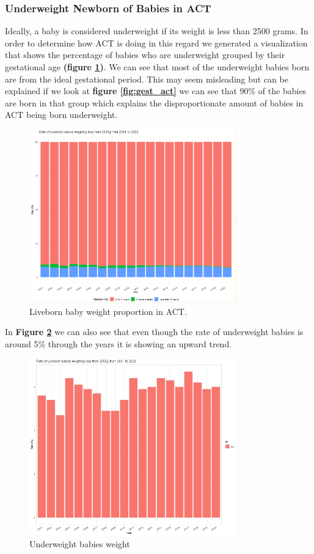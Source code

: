 \subsubsection{Underweight Newborn of Babies in ACT}
Ideally, a baby is considered underweight if its weight is less than 2500 grams. In order to determine how ACT is doing in this regard we generated a visualization that shows the percentage of babies who are underweight grouped by their gestational age \textbf{(figure \ref{fig:weight_gest})}. We can see that most of the underweight babies born are from the ideal gestational period. This may seem misleading but can be explained if we look at \textbf{figure \ref{fig:gest_act}} we can see that 90\% of the babies are born in that group which explains the disproportionate amount of babies in ACT being born underweight.

\begin{figure}
  \centering
  \includegraphics[width=0.8\textwidth]{subsections/baby_health/live_born_weigh_proportion_act.png}
  \caption{Liveborn baby weight proportion in ACT.}
  \label{fig:weight_gest}
\end{figure}

In \textbf{Figure \ref{fig:weight_act}} we can also see that even though the rate of underweight babies is around 5\% through the years it is showing an upward trend.

\begin{figure}
  \centering
  \includegraphics[width=0.8\textwidth]{subsections/baby_health/liveborn_weight.jpg}
  \caption{Underweight babies weight}
  \label{fig:weight_act}
\end{figure}